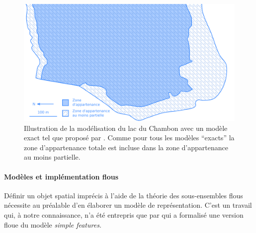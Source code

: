 \begin{figure}
  \centering
  \includegraphics{../figures/fig7.png}
  \caption{Illustration de la modélisation du lac du Chambon avec un
    modèle exact tel que proposé par \textcite{Bejaoui2009}. Comme
    pour tous les modèles “exacts” la zone d’appartenance totale est
    incluse dans la zone d’appartenance au moins partielle.}
  \label{fig:champ_exact}
\end{figure}

\paragraph{Modèles et implémentation flous}

Définir un objet spatial imprécis à l’aide de la théorie des
sous-ensembles flous nécessite au préalable d’en élaborer un modèle de
représentation. C’est un travail qui, à notre connaissance, n’a été
entrepris que par \textcite{Schneider1999,Schneider2001} qui a
formalisé une version floue du modèle \emph{simple features.}

